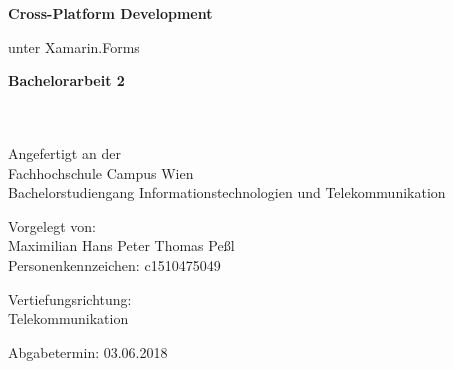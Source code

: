 \begin{center}

\vspace{1.3cm}

\hspace*{-1.0cm} {\Large \textbf{Cross-Platform Development\\}}

\hspace*{-1.0cm} unter Xamarin.Forms \\

\vspace{2.2cm}

\hspace*{-1.0cm} \textbf{Bachelorarbeit 2\\}

\vspace{0.65cm}

\hspace*{-1.0cm}\\
\hspace*{-1.0cm}\\
\hspace*{-1.0cm} Angefertigt an der \\
\hspace*{-1.0cm} Fachhochschule Campus Wien \\
\hspace*{-1.0cm} Bachelorstudiengang Informationstechnologien und Telekommunikation \\

\vspace{7cm}

\hspace*{-1.0cm} Vorgelegt von: \\
\hspace*{-1.0cm} Maximilian Hans Peter Thomas Peßl \\
\hspace*{-1.0cm} Personenkennzeichen: c1510475049 \\

\vspace{2.1cm}

\hspace*{-1.0cm} Vertiefungsrichtung: \\
\hspace*{-1.0cm} Telekommunikation\\

\vspace{0.5cm}


\vspace{1.4cm}

\hspace*{-1.0cm} Abgabetermin: 03.06.2018 \\

\end{center}

